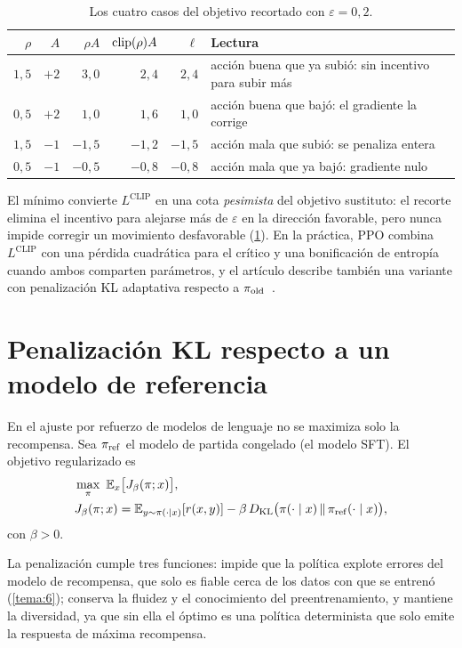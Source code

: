 \begin{table}[h]
\centering\small
\begin{tabular}{@{}rrrrrl@{}}
\toprule
$\rho$ & $A$ & $\rho A$ & $\operatorname{clip}(\rho)A$ & $\ell$ & Lectura \\
\midrule
$1{,}5$ & $+2$ & $3{,}0$ & $2{,}4$ & $2{,}4$ & acción buena que ya subió: sin incentivo para subir más \\
$0{,}5$ & $+2$ & $1{,}0$ & $1{,}6$ & $1{,}0$ & acción buena que bajó: el gradiente la corrige \\
$1{,}5$ & $-1$ & $-1{,}5$ & $-1{,}2$ & $-1{,}5$ & acción mala que subió: se penaliza entera \\
$0{,}5$ & $-1$ & $-0{,}5$ & $-0{,}8$ & $-0{,}8$ & acción mala que ya bajó: gradiente nulo \\
\bottomrule
\end{tabular}
\caption{Los cuatro casos del objetivo recortado con $\varepsilon=0{,}2$.}
\label{tab:ppo}
\end{table}

El mínimo convierte $L^{\mathrm{CLIP}}$ en una cota \emph{pesimista} del objetivo sustituto: el recorte elimina el incentivo para alejarse más de $\varepsilon$ en la dirección favorable, pero nunca impide corregir un movimiento desfavorable (\cref{tab:ppo}). En la práctica, PPO combina $L^{\mathrm{CLIP}}$ con una pérdida cuadrática para el crítico y una bonificación de entropía cuando ambos comparten parámetros, y el artículo describe también una variante con penalización KL adaptativa respecto a $\pi_{\mathrm{old}}$~\cite[§4]{ppo}.

\section{Penalización KL respecto a un modelo de referencia}

En el ajuste por refuerzo de modelos de lenguaje no se maximiza solo la recompensa. Sea $\pi_{\mathrm{ref}}$ el modelo de partida congelado (el modelo SFT). El objetivo regularizado es~\cite{instructgpt}
\begin{equation}\label{eq:obj-kl}
\begin{aligned}&\max_{\pi}\ \mathbb{E}_{x}\bigl[J_\beta(\pi;x)\bigr],\\ &J_\beta(\pi;x)=\mathbb{E}_{y\sim\pi(\cdot\mid x)}[r(x,y)]-\beta\,D_{\mathrm{KL}}\bigl(\pi(\cdot\mid x)\,\|\,\pi_{\mathrm{ref}}(\cdot\mid x)\bigr),\end{aligned}
\end{equation}
con $\beta>0$.

La penalización cumple tres funciones: impide que la política explote errores del modelo de recompensa, que solo es fiable cerca de los datos con que se entrenó (\cref{tema:6}); conserva la fluidez y el conocimiento del preentrenamiento, y mantiene la diversidad, ya que sin ella el óptimo es una política determinista que solo emite la respuesta de máxima recompensa.

